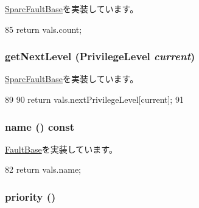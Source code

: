 \hyperlink{classSparcISA_1_1SparcFaultBase_a5d92ccd11b5cd6b04f02bd0a088b776c}{SparcFaultBase}を実装しています。


\begin{DoxyCode}
85 { return vals.count; }
\end{DoxyCode}
\hypertarget{classSparcISA_1_1SparcFault_a58c48783e8f5974a57301021b9dba072}{
\subsubsection[{getNextLevel}]{ getNextLevel ({\bf PrivilegeLevel} {\em current})}}
\label{classSparcISA_1_1SparcFault_a58c48783e8f5974a57301021b9dba072}


\hyperlink{classSparcISA_1_1SparcFaultBase_abbea6b59bcf7fbc89628c049aa7cf670}{SparcFaultBase}を実装しています。


\begin{DoxyCode}
89     {
90         return vals.nextPrivilegeLevel[current];
91     }
\end{DoxyCode}
\hypertarget{classSparcISA_1_1SparcFault_a73adb23259baf912a81683a9790a303f}{
\subsubsection[{name}]{ name () const}}
\label{classSparcISA_1_1SparcFault_a73adb23259baf912a81683a9790a303f}


\hyperlink{classFaultBase_aad960357563b8b969d2dffdcc6861de7}{FaultBase}を実装しています。


\begin{DoxyCode}
82 { return vals.name; }
\end{DoxyCode}
\hypertarget{classSparcISA_1_1SparcFault_a57b9ac2b92afbf2567e6d7b131900712}{
\subsubsection[{priority}]{ priority ()}}
\label{classSparcISA_1_1SparcFault_a57b9ac2b92afbf2567e6d7b131900712}


